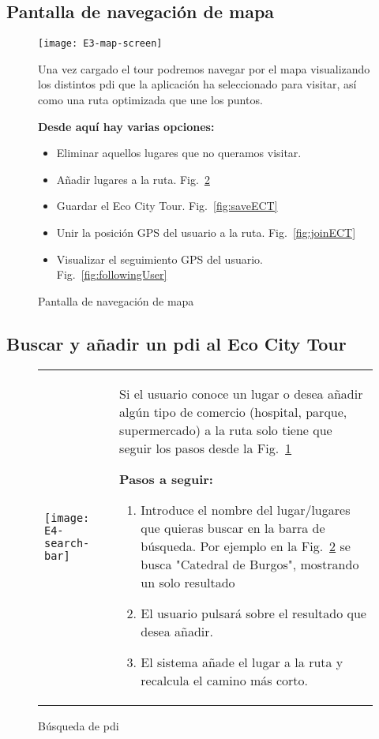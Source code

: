 \subsection{Pantalla de navegación de mapa}
\begin{figure}[H]
	\centering

		\texttt{[image: E3-map-screen]}
		\label{fig:navegacionMapa}
		\caption{Pantalla de navegación de mapa}
		
		Una vez cargado el tour podremos navegar por el mapa visualizando los distintos \acrshort{pdi} que la aplicación ha seleccionado para visitar, así como una ruta optimizada que une los puntos.
		
		\textbf{Desde aquí hay varias opciones:}
		\begin{itemize}
			\item Eliminar aquellos lugares que no queramos visitar.
			\item Añadir lugares a la ruta. Fig.~\ref{fig:busquedaPDI}
			\item Guardar el Eco City Tour. Fig.~\ref{fig:saveECT}
			\item Unir la posición GPS del usuario a la ruta. Fig.~\ref{fig:joinECT}
			\item Visualizar el seguimiento GPS del usuario. Fig.~\ref{fig:followingUser}
		\end{itemize}		
	
\end{figure}


\subsection{Buscar y añadir un \acrlong{pdi} al Eco City Tour}
\begin{figure}[H]
	\centering
	\begin{tabular}{m{} m{}}
		\texttt{[image: E4-search-bar]} & 
		\vspace{-10pt}
		Si el usuario conoce un lugar o desea añadir algún tipo de comercio (hospital, parque, supermercado) a la ruta solo tiene que seguir los pasos desde la Fig.~\ref{fig:navegacionMapa} 
		
		\textbf{Pasos a seguir:}
		\begin{enumerate}
			\item Introduce el nombre del lugar/lugares que quieras buscar en la barra de búsqueda. Por ejemplo en la Fig.~\ref{fig:busquedaPDI} se busca "Catedral de Burgos", mostrando un solo resultado 
			\item El usuario pulsará sobre el resultado que desea añadir.
			\item El sistema añade el lugar a la ruta y recalcula el camino más corto.
		\end{enumerate}		
	\end{tabular}
	\caption{Búsqueda de \acrshort{pdi}}
	\label{fig:busquedaPDI}
\end{figure}


